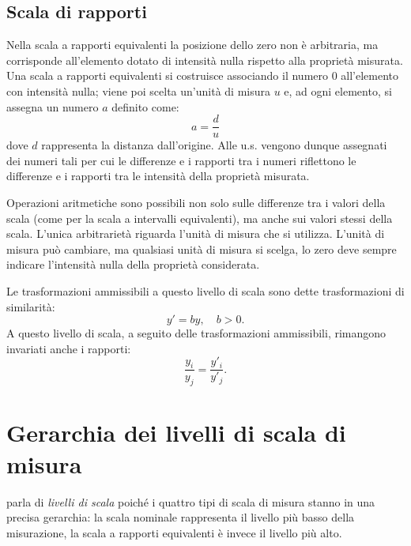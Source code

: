 \documentclass[
  11pt,
]{krantz}
\theoremstyle{definition}
\theoremstyle{definition}
\theoremstyle{definition}
\theoremstyle{definition}
\theoremstyle{remark}
\begin{document}
\hypertarget{scala-di-rapporti}{%
\subsection{Scala di rapporti}\label{scala-di-rapporti}}

Nella scala a rapporti equivalenti la posizione dello zero non è arbitraria, ma corrisponde all'elemento dotato di intensità nulla rispetto alla proprietà misurata. Una scala a rapporti equivalenti si costruisce associando il numero 0 all'elemento con intensità nulla; viene poi scelta un'unità di misura \(u\) e, ad ogni elemento, si assegna un numero \(a\) definito come: \[a = \frac{d}{u}\] dove \(d\) rappresenta la distanza dall'origine. Alle u.s. vengono dunque assegnati dei numeri tali per cui le differenze e i rapporti tra i numeri riflettono le differenze e i rapporti tra le intensità della proprietà misurata.

Operazioni aritmetiche sono possibili non solo sulle differenze tra i valori della scala (come per la scala a intervalli equivalenti), ma anche sui valori stessi della scala. L'unica arbitrarietà riguarda l'unità di misura che si utilizza. L'unità di misura può cambiare, ma qualsiasi unità di misura si scelga, lo zero deve sempre indicare l'intensità nulla della proprietà considerata.

Le trasformazioni ammissibili a questo livello di scala sono dette trasformazioni di similarità: \[y' = by, \quad b > 0.\] A questo livello di scala, a seguito delle trasformazioni ammissibili, rimangono invariati anche i rapporti: \[\frac{y_i}{y_j} = \frac{y'_i}{y'_j}.\]

\hypertarget{gerarchia-dei-livelli-di-scala-di-misura}{%
\section{Gerarchia dei livelli di scala di misura}\label{gerarchia-dei-livelli-di-scala-di-misura}}

\citet{stevens46} parla di \emph{livelli di scala} poiché i quattro tipi di scala di misura stanno in una precisa gerarchia: la scala nominale rappresenta il livello più basso della misurazione, la scala a rapporti equivalenti è invece il livello più alto.
\end{document}
